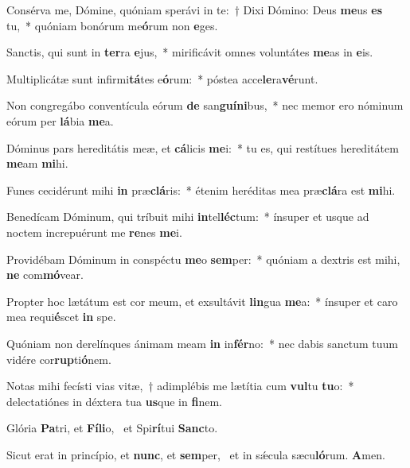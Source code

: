 \item Consérva me, Dómine, quóniam sperávi in te:~† Dixi Dómino: Deus \textbf{me}us \textbf{es} tu,~* quóniam bonórum me\textbf{ó}rum non \textbf{e}ges.
\item Sanctis, qui sunt in \textbf{ter}ra \textbf{e}jus,~* mirificávit omnes voluntátes \textbf{me}as in \textbf{e}is.
\item Multiplicátæ sunt infirmi\textbf{tá}tes e\textbf{ó}rum:~* póstea acce\textbf{le}ra\textbf{vé}runt.
\item Non congregábo conventícula eórum \textbf{de} san\textbf{guí}\textbf{ni}bus,~* nec memor ero nóminum eórum per \textbf{lá}bia \textbf{me}a.
\item Dóminus pars hereditátis meæ, et \textbf{cá}licis \textbf{me}i:~* tu es, qui restítues hereditátem \textbf{me}am \textbf{mi}hi.
\item Funes cecidérunt mihi \textbf{in} præ\textbf{clá}ris:~* étenim heréditas mea præ\textbf{clá}ra est \textbf{mi}hi.
\item Benedícam Dóminum, qui tríbuit mihi \textbf{in}tel\textbf{léc}tum:~* ínsuper et usque ad noctem increpuérunt me \textbf{re}nes \textbf{me}i.
\item Providébam Dóminum in conspéctu \textbf{me}o \textbf{sem}per:~* quóniam a dextris est mihi, \textbf{ne} com\textbf{mó}vear.
\item Propter hoc lætátum est cor meum, et exsultávit \textbf{lin}gua \textbf{me}a:~* ínsuper et caro mea requi\textbf{é}scet \textbf{in} spe.
\item Quóniam non derelínques ánimam meam \textbf{in} in\textbf{fér}no:~* nec dabis sanctum tuum vidére cor\textbf{rup}ti\textbf{ó}nem.
\item Notas mihi fecísti vias vitæ,~† adimplébis me lætítia cum \textbf{vul}tu \textbf{tu}o:~* delectatiónes in déxtera tua \textbf{us}que in \textbf{fi}nem.
\item Glória \textbf{Pa}tri, et \textbf{Fí}\textbf{li}o,~\psstar{} et Spi\textbf{rí}tui \textbf{Sanc}to.
\item Sicut erat in princípio, et \textbf{nunc}, et \textbf{sem}per,~\psstar{} et in sǽcula sæcu\textbf{ló}rum. \textbf{A}men.